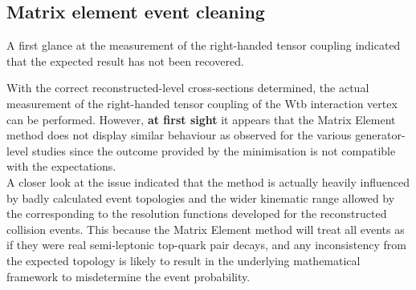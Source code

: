%

\subsection{Matrix element event cleaning} \label{subsec::EvtCleaning}

A first glance at the measurement of the right-handed tensor coupling indicated that the expected result has not been recovered.


With the correct reconstructed-level cross-sections determined, the actual measurement of the right-handed tensor coupling of the Wtb interaction vertex can be performed.
However, \textbf{at first sight} it appears that the Matrix Element method does not display similar behaviour as observed for the various generator-level studies since the outcome provided by the minimisation is not compatible with the expectations.
\\
A closer look at the issue indicated that the method is actually heavily influenced by badly calculated event topologies and the wider kinematic range allowed by the corresponding to the resolution functions developed for the reconstructed collision events.
This because the Matrix Element method will treat all events as if they were real semi-leptonic top-quark pair decays, and any inconsistency from the expected topology is likely to result in the underlying mathematical framework to misdetermine the event probability.
\\

